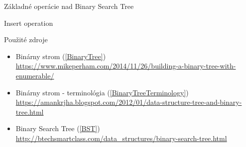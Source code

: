 \documentclass[11pt]{beamer}
\begin{document}
\begin{frame}{Základné operácie nad Binary Search Tree}

\begin{algorithm}[H]
\caption{Insert operation}\label{insert}
\SetNlSkip{-1.2em}
\SetInd{1em}{1em}
\SetNlSty{}{}{:}

\Indp\Indpp
\BlankLine
{}
\end{algorithm}
\end{frame}

\begin{frame}{Použité zdroje}
\begin{itemize}
    \item Binárny strom (\ref{BinaryTree}) \\ \vspace{0.5mm}
    {\footnotesize \url{https://www.mikeperham.com/2014/11/26/building-a-binary-tree-with-enumerable/}}
    \item Binárny strom - terminológia (\ref{BinaryTreeTerminology})\\
        {\footnotesize \url{https://amankrjha.blogspot.com/2012/01/data-structure-tree-and-binary-tree.html}}
    \item Binary Search Tree (\ref{BST})\\
    {\footnotesize \url{http://btechsmartclass.com/data_structures/binary-search-tree.html}}
\end{itemize}
\end{frame}
\end{document}
